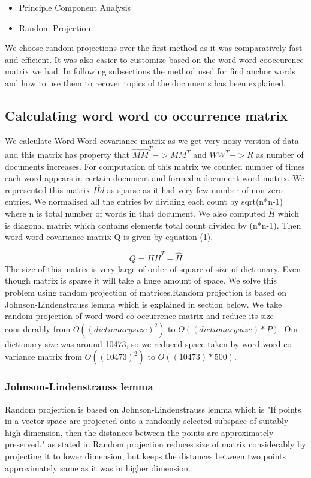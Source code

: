 \documentclass[a4paper,11pt]{article}
\begin{document}
\begin{itemize}
\item Principle Component Analysis
\item Random Projection 
\end{itemize} 

We choose random projections over the first method as it was comparatively fast and efficient. It was also easier to customize based on the word-word cooccurence matrix we had. In following subsections the method used for find anchor words and how to use them to recover topics of the documents has been explained. \\

\subsection{Calculating word word co occurrence matrix}
We calculate Word Word covariance matrix as we get very noisy version of data and this matrix has property that  $\hat{M} \hat{M}^T -> M M^T $ and $W W^T -> R$ as number of documents increases. For computation of this matrix we counted number of times each word appears in certain document and formed a document word matrix. We represented this matrix $\bar{Hd}$ as sparse as it had very few number of non zero entries. We normalised all the entries by dividing each count by sqrt(n*n-1) where n is total number of words in that document. We also computed $\hat{H}$ which is diagonal matrix which contains elements total count divided by (n*n-1). Then word word covariance matrix Q is given by equation (1).

\begin{equation}
Q = \bar{H} \bar{H}^T - \hat{H}
\end{equation}
The size of this matrix is very large of order of square of size of dictionary. Even though matrix is sparse it will take a huge amount of space. We solve this problem using random projection of matrices.Random projection is based on Johnson-Lindenstrauss lemma which is explained in section below. We take random projection of word word co occurrence matrix and reduce its size considerably from $O((dictionary size)^2)$ to $O((dictionary size)*P)$. Our dictionary size was around 10473, so we reduced space taken by word word co variance matrix from $O((10473)^2)$ to $O((10473)*500)$.

\subsubsection{Johnson-Lindenstrauss lemma}
Random projection is based on Johnson-Lindenstrauss lemma which is "If points in a vector space are projected onto a randomly selected subspace of suitably high dimension, then the distances between the points are approximately preserved." as stated in \cite{randomProjection} Random projection reduces size of matrix considerably by projecting it to lower dimension, but keeps the distances between two points approximately same as it was in higher dimension.
\end{document}
